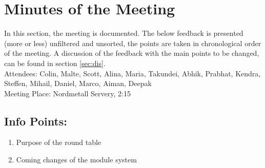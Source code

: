
\section{Minutes of the Meeting}
\label{sec-1}
In this section, the meeting is documented. The below feedback is presented (more or less) unfiltered and unsorted, the points are taken in chronological order of the meeting. 
A discussion of the feedback with the main points to be changed, can be found in section \ref{sec:dis}. \\

\noindent Attendees: Colin, Malte, Scott, Alina, Maria, Takundei, Abhik, Prabhat, Kendra, Steffen, Mihail, Daniel, Marco, Aiman, Deepak\\
\noindent Meeting Place: Nordmetall Servery, 2:15
\subsection{Info Points:}
\label{sec-1-1}
\begin{enumerate}
\item Purpose of the round table
\item Coming changes of the module system
\end{enumerate}
